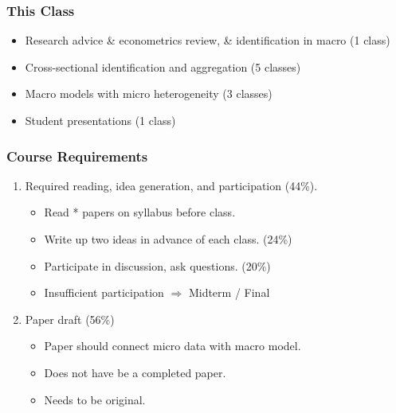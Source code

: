 \documentclass[english,xcolor=svgnames]{beamer}
\begin{document}
\begin{frame}
\frametitle[alignment=center]{This Class}
\begin{itemize}
	\item Research advice \& econometrics review, \& identification in macro  (1 class)
	\item Cross-sectional identification and aggregation (5 classes)
	\item Macro models with micro heterogeneity (3 classes)
	\item Student presentations (1 class)
\end{itemize}
\end{frame}


\begin{frame}
\frametitle[alignment=center]{Course Requirements}
\begin{enumerate}
	\item Required reading, idea generation, and participation (44\%).
	\begin{itemize}
		\item Read * papers on syllabus before class.
		\item Write up two ideas in advance of each class. (24\%)
		\item Participate in discussion, ask questions. (20\%)
		\item Insufficient participation $\Rightarrow$ Midterm / Final
	\end{itemize}
	\item Paper draft (56\%)
	\begin{itemize}
		\item Paper should connect micro data with macro model.
		\item Does not have be a completed paper.
		\item Needs to be original. 
	\end{itemize}
\end{enumerate}
\end{frame}
\end{document}
